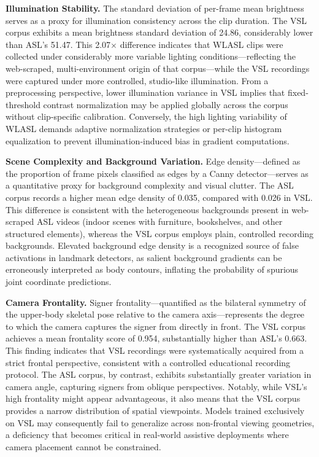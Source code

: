 \documentclass{ieeeaccess}
\begin{document}
\textbf{Illumination Stability.} The standard deviation of per-frame mean brightness serves as a proxy for illumination consistency across the clip duration. The VSL corpus exhibits a mean brightness standard deviation of 24.86, considerably lower than ASL's 51.47. This 2.07$\times$ difference indicates that WLASL clips were collected under considerably more variable lighting conditions—reflecting the web-scraped, multi-environment origin of that corpus—while the VSL recordings were captured under more controlled, studio-like illumination. From a preprocessing perspective, lower illumination variance in VSL implies that fixed-threshold contrast normalization may be applied globally across the corpus without clip-specific calibration. Conversely, the high lighting variability of WLASL demands adaptive normalization strategies or per-clip histogram equalization to prevent illumination-induced bias in gradient computations.

\textbf{Scene Complexity and Background Variation.} Edge density—defined as the proportion of frame pixels classified as edges by a Canny detector—serves as a quantitative proxy for background complexity and visual clutter. The ASL corpus records a higher mean edge density of 0.035, compared with 0.026 in VSL. This difference is consistent with the heterogeneous backgrounds present in web-scraped ASL videos (indoor scenes with furniture, bookshelves, and other structured elements), whereas the VSL corpus employs plain, controlled recording backgrounds. Elevated background edge density is a recognized source of false activations in landmark detectors, as salient background gradients can be erroneously interpreted as body contours, inflating the probability of spurious joint coordinate predictions.

\textbf{Camera Frontality.} Signer frontality—quantified as the bilateral symmetry of the upper-body skeletal pose relative to the camera axis—represents the degree to which the camera captures the signer from directly in front. The VSL corpus achieves a mean frontality score of 0.954, substantially higher than ASL's 0.663. This finding indicates that VSL recordings were systematically acquired from a strict frontal perspective, consistent with a controlled educational recording protocol. The ASL corpus, by contrast, exhibits substantially greater variation in camera angle, capturing signers from oblique perspectives. Notably, while VSL's high frontality might appear advantageous, it also means that the VSL corpus provides a narrow distribution of spatial viewpoints. Models trained exclusively on VSL may consequently fail to generalize across non-frontal viewing geometries, a deficiency that becomes critical in real-world assistive deployments where camera placement cannot be constrained.
\end{document}
